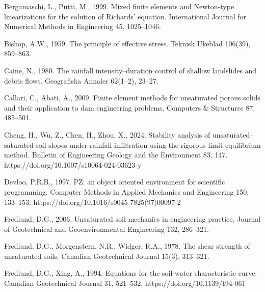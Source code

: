Bergamaschi, L., Putti, M., 1999. Mixed finite elements and Newton-type linearizations for the solution of Richards'
equation. International Journal for Numerical Methods in Engineering 45, 1025--1046.

Bishop, A.W., 1959. The principle of effective stress. Teknisk Ukeblad 106(39), 859--863.

Caine, N., 1980. The rainfall intensity--duration control of shallow landslides and debris flows. Geografiska
Annaler 62(1--2), 23--27.

Callari, C., Abati, A., 2009. Finite element methods for unsaturated porous solids and their application to dam
engineering problems. Computers \& Structures 87, 485--501.

Cheng, H., Wu, Z., Chen, H., Zhou, X., 2024. Stability analysis of unsaturated--saturated soil slopes under rainfall
infiltration using the rigorous limit equilibrium method. Bulletin of Engineering Geology and the Environment 83, 147.
https://doi.org/10.1007/s10064-024-03623-y

Devloo, P.R.B., 1997. PZ: an object oriented environment for scientific programming. Computer Methods in Applied
Mechanics and Engineering 150, 133--153. https://doi.org/10.1016/s0045-7825(97)00097-2

Fredlund, D.G., 2006. Unsaturated soil mechanics in engineering practice. Journal of Geotechnical and
Geoenvironmental Engineering 132, 286--321.

Fredlund, D.G., Morgenstern, N.R., Widger, R.A., 1978. The shear strength of unsaturated soils. Canadian
Geotechnical Journal 15(3), 313--321.

Fredlund, D.G., Xing, A., 1994. Equations for the soil-water characteristic curve. Canadian Geotechnical Journal
31, 521--532. https://doi.org/10.1139/t94-061

